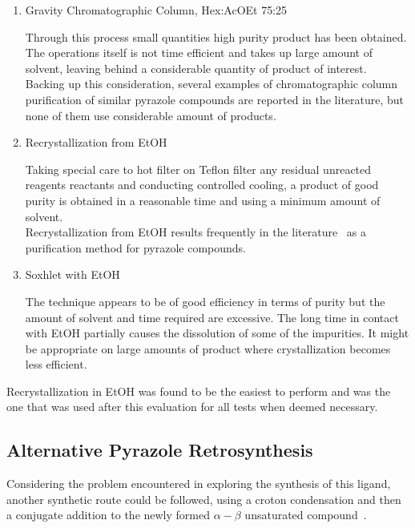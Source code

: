 \documentclass[../Master.tex]{subfiles}
\begin{document}
\begin{enumerate}
	\item  Gravity Chromatographic Column, Hex:AcOEt 75:25

	      Through this process small quantities high purity product has been obtained. The operations itself is not time efficient and takes up large amount of solvent, leaving behind a considerable quantity of product of interest.\\
	      Backing up this consideration, several examples of chromatographic column purification of similar pyrazole compounds are reported in the literature, but none of them use considerable amount of products.
	\item Recrystallization from EtOH

	      Taking special care to hot filter on Teflon filter any residual unreacted reagents reactants and conducting controlled cooling, a product of good purity is obtained in a reasonable time and using a minimum amount of solvent. \\
	      Recrystallization from EtOH results frequently in the literature\ \cite{joshi_synthesis_2004} as a purification method for pyrazole compounds.
	\item Soxhlet with EtOH

	      The technique appears to be of good efficiency in terms of purity but the amount of solvent and time required are excessive. The long time in contact with EtOH partially causes the dissolution of some of the impurities. It might be appropriate on large amounts of product where
	      crystallization becomes less efficient.
\end{enumerate}

Recrystallization in EtOH was found to be the easiest to perform and was the one that was used after this evaluation for all tests when deemed necessary.

\subsection{Alternative Pyrazole Retrosynthesis}\label{sec:alt-pyrazole-synthe}

Considering the problem encountered in exploring the synthesis of this ligand, another synthetic route could be followed, using a croton condensation and then a conjugate addition to the newly formed \(\alpha-\beta\) unsaturated compound\ \cite{cinar_synthesis_2021}.
\end{document}
